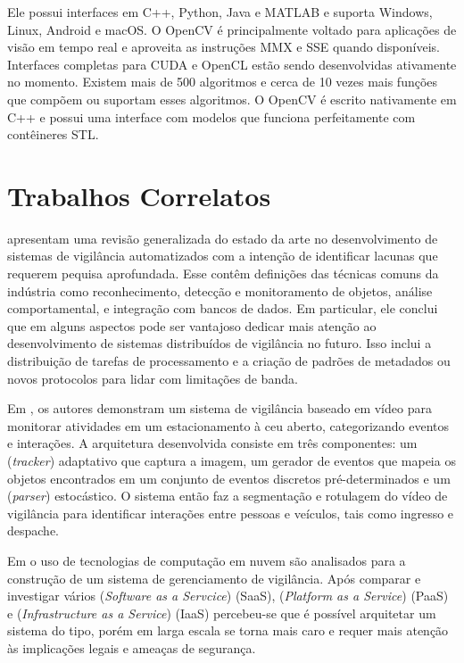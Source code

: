 \documentclass[12pt, %
openright, 
oneside, %
a4paper,    %
brazil]{facom-ufu-abntex2}
\begin{document}
Ele possui interfaces em C++, Python, Java e MATLAB e suporta Windows, Linux,
Android e macOS. O OpenCV é principalmente voltado para aplicações de visão em
tempo real e aproveita as instruções MMX e SSE quando disponíveis. Interfaces
completas para CUDA e OpenCL estão sendo desenvolvidas ativamente no momento.
Existem mais de 500 algoritmos e cerca de 10 vezes mais funções que compõem ou
suportam esses algoritmos. O OpenCV é escrito nativamente em C++ e possui uma
interface com modelos que funciona perfeitamente com contêineres STL.
\cite{opencvwebsite}

\section{Trabalhos Correlatos}

 apresentam uma revisão generalizada do estado da arte
no desenvolvimento de sistemas de vigilância automatizados com a intenção de identificar lacunas
que requerem pequisa aprofundada. Esse contêm definições das técnicas
comuns da indústria como reconhecimento, detecção e monitoramento de objetos, análise comportamental,
e integração com bancos de dados. Em particular, ele conclui que em alguns aspectos pode ser vantajoso
dedicar mais atenção ao desenvolvimento de sistemas distribuídos de vigilância no futuro. Isso inclui
a distribuição de tarefas de processamento e a criação de padrões de metadados
ou novos protocolos para lidar com limitações de banda.

Em , os autores demonstram um sistema de vigilância baseado
em vídeo para monitorar atividades em um estacionamento à ceu aberto,
categorizando eventos e interações. A arquitetura desenvolvida consiste em três
componentes: um (\textit{\foreignlanguage{english}{tracker}}) adaptativo que
captura a imagem, um gerador de eventos que mapeia os objetos encontrados em um
conjunto de eventos discretos pré-determinados e um
(\textit{\foreignlanguage{english}{parser}}) estocástico. O sistema então faz a
segmentação e rotulagem do vídeo de vigilância para identificar interações
entre pessoas e veículos, tais como ingresso e despache.

Em  o uso de tecnologias de computação em nuvem são
analisados para a construção de um sistema de gerenciamento de vigilância. Após
comparar e investigar vários (\textit{\foreignlanguage{english}{Software as a
		Servcice}}) (SaaS), (\textit{\foreignlanguage{english}{Platform as a Service}})
(PaaS) e (\textit{\foreignlanguage{english}{Infrastructure as a Service}})
(IaaS) percebeu-se que é possível arquitetar um sistema do tipo, porém em larga
escala se torna mais caro e requer mais atenção às implicações legais e ameaças
de segurança.
\end{document}
